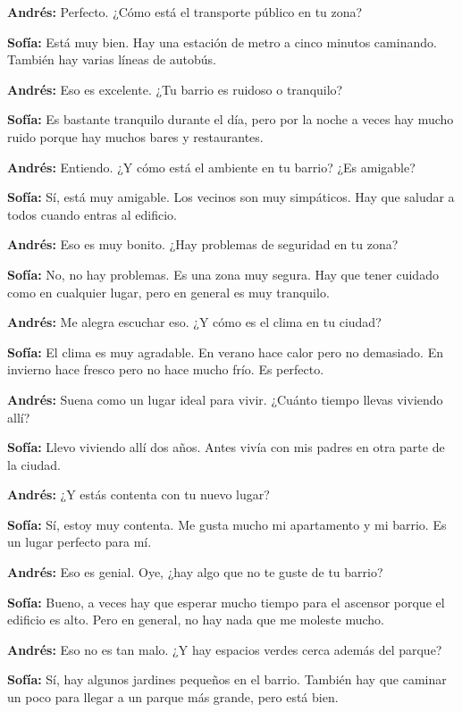 \documentclass[12pt,a4paper]{article}
\begin{document}
\textbf{Andrés:} Perfecto. ¿Cómo está el transporte público en tu zona?

\textbf{Sofía:} Está muy bien. Hay una estación de metro a cinco minutos caminando. También hay varias líneas de autobús.

\textbf{Andrés:} Eso es excelente. ¿Tu barrio es ruidoso o tranquilo?

\textbf{Sofía:} Es bastante tranquilo durante el día, pero por la noche a veces hay mucho ruido porque hay muchos bares y restaurantes.

\textbf{Andrés:} Entiendo. ¿Y cómo está el ambiente en tu barrio? ¿Es amigable?

\textbf{Sofía:} Sí, está muy amigable. Los vecinos son muy simpáticos. Hay que saludar a todos cuando entras al edificio.

\textbf{Andrés:} Eso es muy bonito. ¿Hay problemas de seguridad en tu zona?

\textbf{Sofía:} No, no hay problemas. Es una zona muy segura. Hay que tener cuidado como en cualquier lugar, pero en general es muy tranquilo.

\textbf{Andrés:} Me alegra escuchar eso. ¿Y cómo es el clima en tu ciudad?

\textbf{Sofía:} El clima es muy agradable. En verano hace calor pero no demasiado. En invierno hace fresco pero no hace mucho frío. Es perfecto.

\textbf{Andrés:} Suena como un lugar ideal para vivir. ¿Cuánto tiempo llevas viviendo allí?

\textbf{Sofía:} Llevo viviendo allí dos años. Antes vivía con mis padres en otra parte de la ciudad.

\textbf{Andrés:} ¿Y estás contenta con tu nuevo lugar?

\textbf{Sofía:} Sí, estoy muy contenta. Me gusta mucho mi apartamento y mi barrio. Es un lugar perfecto para mí.

\textbf{Andrés:} Eso es genial. Oye, ¿hay algo que no te guste de tu barrio?

\textbf{Sofía:} Bueno, a veces hay que esperar mucho tiempo para el ascensor porque el edificio es alto. Pero en general, no hay nada que me moleste mucho.

\textbf{Andrés:} Eso no es tan malo. ¿Y hay espacios verdes cerca además del parque?

\textbf{Sofía:} Sí, hay algunos jardines pequeños en el barrio. También hay que caminar un poco para llegar a un parque más grande, pero está bien.
\end{document}
